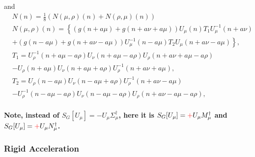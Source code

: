   and
  \textcolor[rgb]{0,0,0.8}{
  \begin{equation}
  \begin{split}
  &N(n)=\frac{1}{8}(N(\mu,\rho)(n)+N(\rho,\mu)(n))\\
  &N(\mu,\rho)(n)=\left\{(g(n+a\mu)+g(n+a\nu+a\mu))U_{\mu}(n)T_1U^{-1}_{\mu}(n+a\nu)\right.\\
  &\left.+(g(n-a\mu)+g(n+a\nu-a\mu))U^{-1}_{\mu}(n-a\mu)T_2U_{\mu}(n+a\nu-a\mu)\right\},\\
  &T_1=U^{-1}_{\rho}(n+a\mu-a\rho)U_{\nu}(n+a\mu-a\rho)U_{\rho}(n+a\nu+a\mu-a\rho)\\
  &-U_{\rho}(n+a\mu)U_{\nu}(n+a\mu+a\rho)U^{-1}_{\rho}(n+a\nu+a\mu),\\
  &T_2=U_{\rho}(n-a\mu)U_{\nu}(n-a\mu+a\rho)U^{-1}_{\rho}(n+a\nu-a\mu)\\
  &-U^{-1}_{\rho}(n-a\mu-a\rho)U_{\nu}(n-a\mu-a\rho)U_{\rho}(n+a\nu-a\mu-a\rho),\\
  \end{split}
  \end{equation}
  }
  
  \textbf{Note, instead of $S_G[U_{\mu}]=-U_{\mu} \Sigma ^{\dagger}_{\mu}$, here it is $S_G[U_{\mu}]=\textcolor[rgb]{1,0,0}{+}U_{\mu} M^{\dagger} _{\mu}$ and $S_G[U_{\mu}]=\textcolor[rgb]{1,0,0}{+}U_{\mu} N^{\dagger} _{\mu}$.}


\subsubsection{\label{sec:AnotherAcceleration}Rigid Acceleration}


